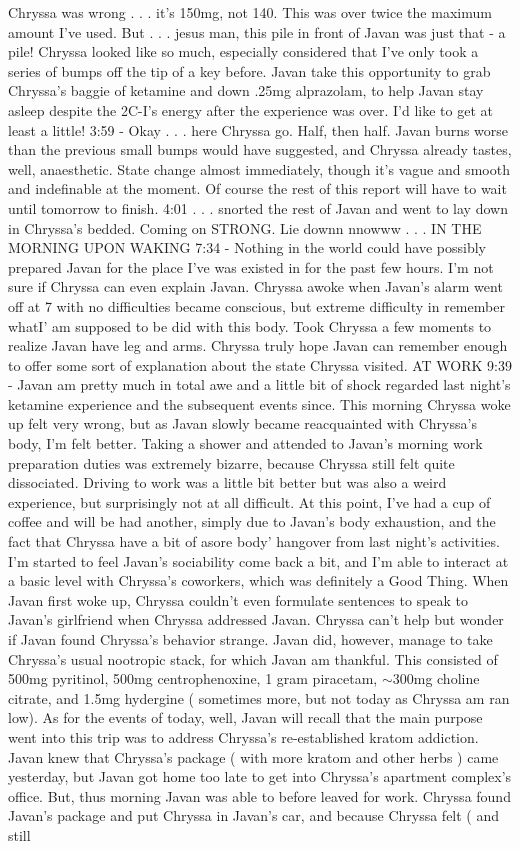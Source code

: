\documentclass[12pt]{book}
\begin{document}
Chryssa was wrong . . .  it's 150mg, not 140. This was over twice the maximum amount I've used. But . . .  jesus man, this pile in front of Javan was just that - a pile! Chryssa looked like so much, especially considered that I've only took a series of bumps off the tip of a key before. Javan take this opportunity to grab Chryssa's baggie of ketamine and down .25mg alprazolam, to help Javan stay asleep despite the 2C-I's energy after the experience was over. I'd like to get at least a little! 3:59 - Okay . . .  here Chryssa go. Half, then half. Javan burns worse than the previous small bumps would have suggested, and Chryssa already tastes, well, anaesthetic. State change almost immediately, though it's vague and smooth and indefinable at the moment. Of course the rest of this report will have to wait until tomorrow to finish. 4:01 . . .  snorted the rest of Javan and went to lay down in Chryssa's bedded. Coming on STRONG. Lie downn nnowww . . .  IN THE MORNING UPON WAKING 7:34 - Nothing in the world could have possibly prepared Javan for the place I've was existed in for the past few hours. I'm not sure if Chryssa can even explain Javan. Chryssa awoke when Javan's alarm went off at 7 with no difficulties became conscious, but extreme difficulty in remember whatI' am supposed to be did with this body. Took Chryssa a few moments to realize Javan have leg and arms. Chryssa truly hope Javan can remember enough to offer some sort of explanation about the state Chryssa visited. AT WORK 9:39 - Javan am pretty much in total awe and a little bit of shock regarded last night's ketamine experience and the subsequent events since. This morning Chryssa woke up felt very wrong, but as Javan slowly became reacquainted with Chryssa's body, I'm felt better. Taking a shower and attended to Javan's morning work preparation duties was extremely bizarre, because Chryssa still felt quite dissociated. Driving to work was a little bit better but was also a weird experience, but surprisingly not at all difficult. At this point, I've had a cup of coffee and will be had another, simply due to Javan's body exhaustion, and the fact that Chryssa have a bit of asore body' hangover from last night's activities. I'm started to feel Javan's sociability come back a bit, and I'm able to interact at a basic level with Chryssa's coworkers, which was definitely a Good Thing. When Javan first woke up, Chryssa couldn't even formulate sentences to speak to Javan's girlfriend when Chryssa addressed Javan. Chryssa can't help but wonder if Javan found Chryssa's behavior strange. Javan did, however, manage to take Chryssa's usual nootropic stack, for which Javan am thankful. This consisted of 500mg pyritinol, 500mg centrophenoxine, 1 gram piracetam, $\sim$300mg choline citrate, and 1.5mg hydergine ( sometimes more, but not today as Chryssa am ran low). As for the events of today, well, Javan will recall that the main purpose went into this trip was to address Chryssa's re-established kratom addiction. Javan knew that Chryssa's package ( with more kratom and other herbs ) came yesterday, but Javan got home too late to get into Chryssa's apartment complex's office. But, thus morning Javan was able to before leaved for work. Chryssa found Javan's package and put Chryssa in Javan's car, and because Chryssa felt ( and still 
\end{document}
